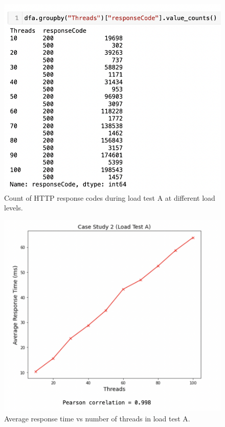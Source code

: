 \begin{figure}[H]
  \centering
  \includegraphics[width=0.6\linewidth]{./assets/images/case-studies/cs02-lta-3.png}
  \caption{Count of HTTP response codes during load test A at different load levels.}
  \label{fig:cs02-lta-3}
\end{figure}

\begin{figure}[H]
  \centering
  \includegraphics[width=0.55\linewidth]{./assets/images/case-studies/cs02-lta-4.png}
  \caption{Average response time vs number of threads in load test A.}
  \label{fig:cs02-lta-4}
\end{figure}

